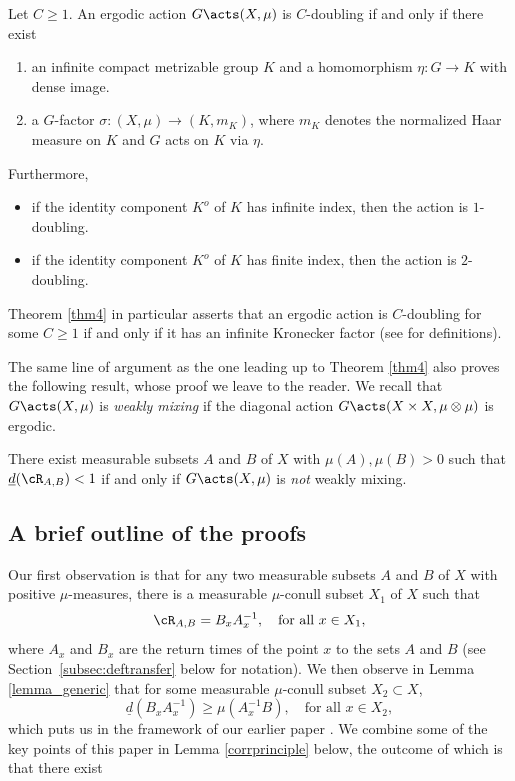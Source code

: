 \begin{theorem}
\label{thm4}
Let $C \geq 1$. An ergodic action $G \acts (X,\mu)$ is $C$\nobreakdash-doubling if and only if there exist

\begin{enumerate}
\item
an infinite compact metrizable group $K$ and a homomorphism $\eta : G \to K$ with dense image.
\item
a $G$-factor $\sigma : (X,\mu) \to (K,m_K)$, where $m_K$ denotes the normalized Haar measure on $K$
and $G$ acts on $K$ via $\eta$.
\end{enumerate}
Furthermore,

\begin{itemize}
\item if the identity component $K^o$ of $K$ has infinite index, then the action is $1$\nobreakdash-doubling.

\item if the identity component $K^o$ of $K$ has finite index, then the action is $2$\nobreakdash-doubling.
\end{itemize}
\end{theorem}

\begin{remark}
Theorem \ref{thm4} in particular asserts that an ergodic action is $C$\nobreakdash-doubling for some $C \geq 1$ if and only if it has an infinite Kronecker
factor (see \eg \cite{BF} for definitions).
\end{remark}

The same line of argument as the one leading up to Theorem \ref{thm4} also proves the following result, whose proof we leave to the reader.
We recall that $G \acts (X,\mu)$ is \emph{weakly mixing} if the diagonal action $G \acts (X \times X,\mu \otimes \mu)$ is ergodic.

\begin{scholium}
There exist measurable subsets $A$ and $B$ of $X$ with $\mu(A),\mu(B) > 0$ such that $\underline{d}(\cR_{A,B}) < 1$ if and only if $G \acts (X,\mu)$ is \emph{not}
weakly mixing.
\end{scholium}

\subsection{A brief outline of the proofs}

Our first observation is that for any two measurable subsets $A$ and $B$ of $X$ with positive $\mu$-measures, there is a measurable
$\mu$-conull subset $X_1$ of $X$ such that
\[
\cR_{A,B} = B_x A_x^{-1}, \quad \textrm{for all $x \in X_1$},
\]
where $A_x$ and $B_x$ are the return times of the point $x$ to the sets $A$ and $B$ (see Section~\ref{subsec:deftransfer} below for notation).
We then observe in Lemma \ref{lemma_generic} that for some measurable $\mu$-conull subset $X_2 \subset X$,
\[
\underline{d}(B_xA_x^{-1}) \geq \mu(A_x^{-1}B), \quad \textrm{for all $x \in X_2$},
\]
which puts us in the framework of our earlier paper \cite{BF}. We combine some of the key points of this paper in Lemma \ref{corrprinciple}
below, the outcome of which is that there exist

